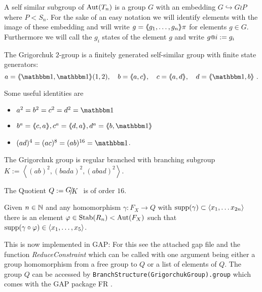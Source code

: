 \documentclass[a4paper,12pt]{article}
\begin{document}
A self similar subgroup of $\textup{Aut}(T_n)$ is a group $G$ with an embedding $G\hookrightarrow G\wr P$  where $P<S_n$. For the sake of an easy notation we
will identify elements with the image of these embedding and will write $g=\langle\negthickspace\langle g_1,\ldots,g_n\rangle\negthickspace\rangle\pi$ for elements $g\in G$. 
Furthermore we will call the $g_i$ states of the element $g$ and write $g\at{i}:=g_i$ 

The Grigorchuk $2$-group is a finitely generated self-similar group with finite state generators:
\[a=\pair{\id,\id}(1,2),\quad b=\pair{a,c},\quad c=\pair{a,d},\quad d=\pair{\id,b}\ . \]

Some useful identities are
\begin{itemize}
 \item $a^2=b^2=c^2=d^2=\id$ 
 \item $b^a= \pair{c,a}, c^a=\pair{d,a}, d^a=\pair{b,\id}$
 \item $(ad)^4=(ac)^8=(ab)^{16}= \id$.
\end{itemize}

\begin{lem}
The Grigorchuk group is regular branched with branching subgroup 
 $K:= \left< (ab)^2,(bada)^2,(abad)^2 \right>$.  
 
 The Quotient $Q := \RNK{G}{K}$ is of order $16$.
\end{lem}

\begin{lem}
 Given $n\in \mathbb{N}$ and any homomorphism $\gamma\colon F_X \to Q$ with $\textup{supp}(\gamma) \subset \left<x_1,\ldots x_{2n}\right>$
 there is an element $\varphi \in \textup{Stab}(R_n)<\textup{Aut}(F_X)$ such that $\textup{supp}(\gamma\circ\varphi) \in \left<x_1,\ldots,x_5\right>$.
\end{lem}
\begin{re}
 This is now implemented in GAP: For this see the 
 attached gap file and the function \emph{ReduceConstraint} which can be called 
 with one argument being either a group homomorphism from a free group to $Q$ or 
 a list of elements of $Q$. The group $Q$ can be accessed by
 \lstinline{BranchStructure(GrigorchukGroup).group} which comes with the GAP package FR \cite{FR2.1.1}.
\end{re}
\end{document}
